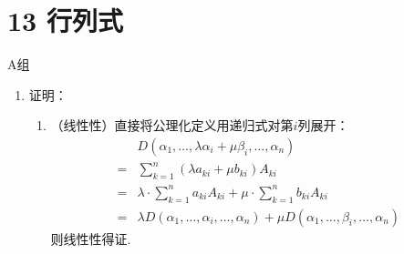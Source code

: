 \section*{13 行列式}

\vspace{2ex}

\centerline{\heiti A组}
\begin{enumerate}
    \item 证明：\begin{enumerate}
              \item （线性性）直接将公理化定义用递归式对第$i$列展开：
                    \begin{align*}
                            & D(\alpha_1,\ldots,\lambda\alpha_{i}+\mu\beta_i,\ldots,\alpha_n)                                      \\
                        ={} & \sum_{k=1}^{n}(\lambda a_{ki}+\mu b_{ki})A_{ki}                                                      \\
                        ={} & \lambda \cdot \sum_{k=1}^{n}a_{ki}A_{ki}+\mu \cdot \sum_{k=1}^{n}b_{ki}A_{ki}                        \\
                        ={} & \lambda D(\alpha_1,\ldots,\alpha_{i},\ldots,\alpha_n)+\mu D(\alpha_1,\ldots,\beta_i,\ldots,\alpha_n)
                    \end{align*}
                    则线性性得证.


\end{enumerate}
\end{enumerate}
